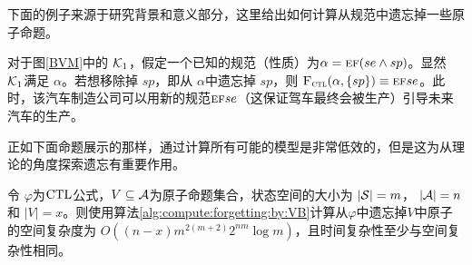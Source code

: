 下面的例子来源于研究背景和意义部分，这里给出如何计算从规范中遗忘掉一些原子命题。 
\begin{example}\label{ex:6}
	对于图\ref{BVM}中的 ${\cal K}_1$，假定一个已知的规范（性质）为$\alpha = \textsc{e}\textsc{f}(se \wedge sp)$。显然 ${\cal K}_1$满足 $\alpha$。若想移除掉 $sp$，即从 $\alpha$中遗忘掉 $sp$，则 ${\textsc{F}_{\textsc{ctl}}}(\alpha,\{ sp\}) \equiv \textsc{e}\textsc{f} se$。此时，该汽车制造公司可以用新的规范$\textsc{e}\textsc{f} se$（这保证驾车最终会被生产）引导未来汽车的生产。
\end{example}


正如下面命题展示的那样，通过计算所有可能的模型是非常低效的，但是这为从理论的角度探索遗忘有重要作用。


\begin{proposition}\label{pro:time:alg1}
	令 $\varphi$为$\textrm{CTL}$公式，$V\subseteq {\cal A}$为原子命题集合，状态空间的大小为 $|{\cal S}|=m$， $|{\cal A}|=n$ 和 $|V|=x$。则使用算法\ref{alg:compute:forgetting:by:VB}计算从$\varphi$中遗忘掉$V$中原子的空间复杂度为 $O((n-x)m^{2(m+2)}2^{nm}  \log m)$，且时间复杂性至少与空间复杂性相同。
\end{proposition}
